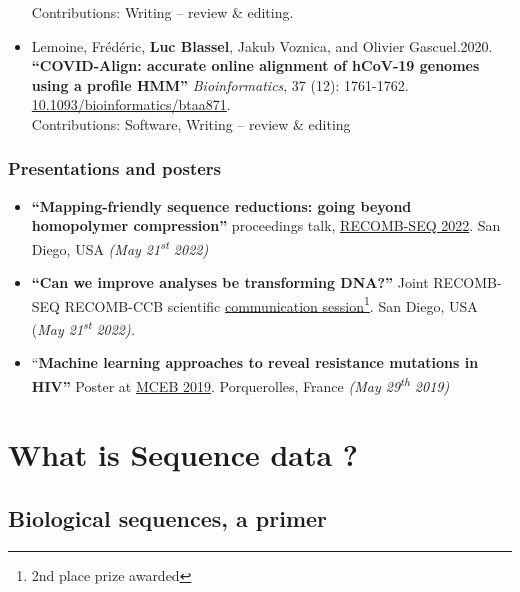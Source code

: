 \documentclass[
  11pt,
  twoside,
  BCOR=10mm,
  listof=totoc]{scrbook}
\begin{document}
\begin{itemize}
  Contributions: Writing -- review \& editing.
\item
  Lemoine, Frédéric, \textbf{Luc Blassel}, Jakub Voznica, and Olivier Gascuel.2020. \textbf{``COVID-Align: accurate online alignment of hCoV-19 genomes using a profile HMM''} \emph{Bioinformatics}, 37 (12): 1761-1762. \href{https://doi.org/10.1093/bioinformatics/btaa871}{10.1093/bioinformatics/btaa871}.\\
  Contributions: Software, Writing -- review \& editing
\end{itemize}

\hypertarget{presentations-and-posters}{%
\subsection*{Presentations and posters}\label{presentations-and-posters}}

\begin{itemize}
\item
  \textbf{``Mapping-friendly sequence reductions: going beyond homopolymer compression''} proceedings talk, \href{https://recomb2022.net/recomb-seq/}{RECOMB-SEQ 2022}. San Diego, USA \emph{(May 21\textsuperscript{st} 2022)}
\item
  \textbf{``Can we improve analyses be transforming DNA?''} Joint RECOMB-SEQ RECOMB-CCB scientific \href{https://recomb2022.net/recomb-ccb-seq-scientific-communication/}{communication session}\footnote{2nd place prize awarded}. San Diego, USA (\emph{May 21\textsuperscript{st}} \emph{2022).}
\item
  ``\textbf{Machine learning approaches to reveal resistance mutations in HIV''} Poster at \href{https://www.lirmm.fr/mceb2019/}{MCEB 2019}. Porquerolles, France \emph{(May 29\textsuperscript{th} 2019)}
\end{itemize}

\hypertarget{what-is-sequence-data}{%
\chapter{What is Sequence data ?}\label{what-is-sequence-data}}

\hypertarget{biological-sequences-a-primer}{%
\section{Biological sequences, a primer}\label{biological-sequences-a-primer}}
\end{document}
